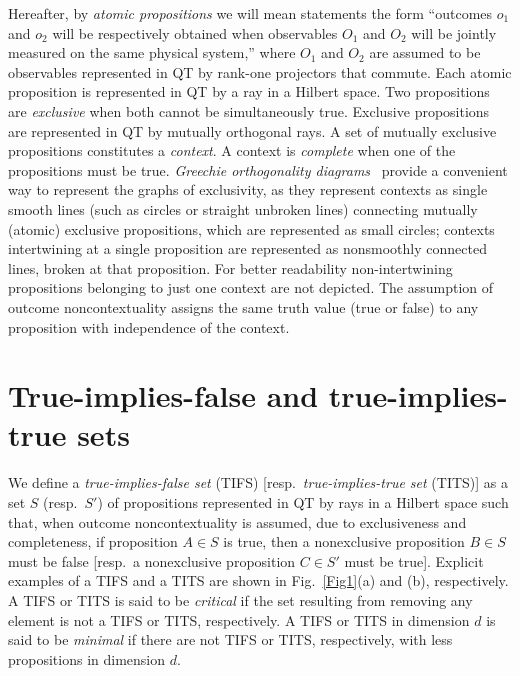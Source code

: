\documentclass[%
 twocolumn,
 groupedaddress,
 showpacs,
 showkeys,
 preprintnumbers,
 amsmath,amssymb,
 aps,
 pra,
 longbibliography,
 floatfix,
 ]{revtex4-1}
\begin{document}
Hereafter, by {\em atomic propositions} we will mean statements the form ``outcomes $o_1$ and $o_2$ will be respectively obtained when observables $O_1$ and $O_2$ will be jointly measured on the same physical system,'' where $O_1$ and $O_2$ are assumed to be observables represented in QT by rank-one projectors that commute. Each atomic proposition is represented in QT by a ray in a Hilbert space. Two propositions are {\em exclusive} when both cannot be simultaneously true. Exclusive propositions are represented in QT by mutually orthogonal rays. A set of mutually exclusive propositions constitutes a {\em context}. A context is {\em complete} when one of the propositions must be true.
{\em Greechie orthogonality diagrams}~\cite{Greechie71} provide a convenient way to represent the graphs of exclusivity, as they represent contexts as single smooth lines (such as circles or straight unbroken lines) connecting mutually (atomic) exclusive propositions, which are represented as small circles; contexts intertwining 
at a single proposition are represented as nonsmoothly connected lines, broken at that proposition. For better readability non-intertwining propositions belonging to just one context are not depicted. The assumption of outcome noncontextuality assigns the same truth value (true or false) to any proposition with independence of the context.


\section{True-implies-false and true-implies-true sets}


We define a {\em true-implies-false set} (TIFS) [resp.\ {\em true-implies-true set} (TITS)] as a set $S$ (resp.\ $S'$) of propositions represented in QT by rays in a Hilbert space such that, when outcome noncontextuality is assumed, due to exclusiveness and completeness, if proposition $A \in S$ is true,
then a nonexclusive proposition $B \in S$ must be false [resp.\ a nonexclusive proposition $C \in S'$ must be true]. Explicit examples of a TIFS and a TITS are shown in Fig.~\ref{Fig1}(a) and (b), respectively. A TIFS or TITS is said to be {\em critical} if the set resulting from removing any element is not a TIFS or TITS, respectively. A TIFS or TITS in dimension $d$ is said to be {\em minimal} if there are not TIFS or TITS, respectively, with less propositions in dimension $d$.
\end{document}
